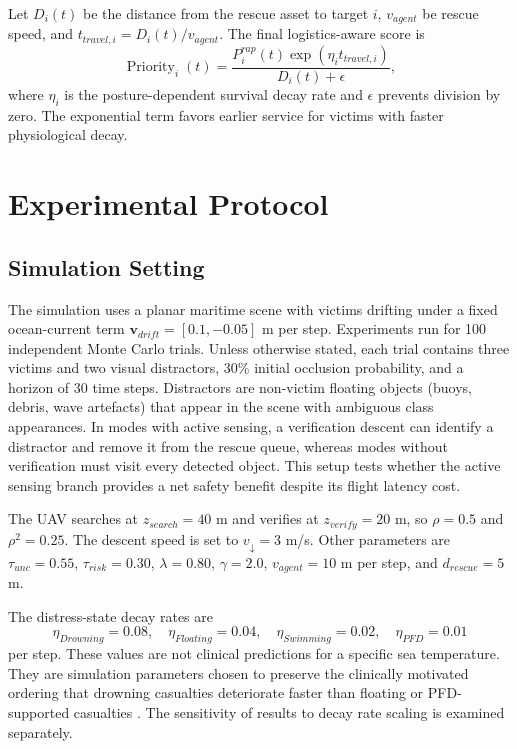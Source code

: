 \documentclass[runningheads]{llncs}
\newcommand{\operatorname}[1]{\mathop{\mathrm{#1}}}
\begin{document}
Let $D_i(t)$ be the distance from the rescue asset to target $i$, $v_{agent}$ be rescue speed, and $t_{travel,i}=D_i(t)/v_{agent}$. The final logistics-aware score is
\begin{equation}
  \operatorname{Priority}_i(t)=
  \frac{P^{rap}_i(t)\exp(\eta_i t_{travel,i})}{D_i(t)+\epsilon},
  \label{eq:priority}
\end{equation}
where $\eta_i$ is the posture-dependent survival decay rate and $\epsilon$ prevents division by zero. The exponential term favors earlier service for victims with faster physiological decay.

\section{Experimental Protocol}

\subsection{Simulation Setting}

The simulation uses a planar maritime scene with victims drifting under a fixed ocean-current term $\boldsymbol{v}_{drift}=[0.1,-0.05]$ m per step. Experiments run for 100 independent Monte Carlo trials. Unless otherwise stated, each trial contains three victims and two visual distractors, 30\% initial occlusion probability, and a horizon of 30 time steps. Distractors are non-victim floating objects (buoys, debris, wave artefacts) that appear in the scene with ambiguous class appearances. In modes with active sensing, a verification descent can identify a distractor and remove it from the rescue queue, whereas modes without verification must visit every detected object. This setup tests whether the active sensing branch provides a net safety benefit despite its flight latency cost.

The UAV searches at $z_{search}=40$ m and verifies at $z_{verify}=20$ m, so $\rho=0.5$ and $\rho^2=0.25$. The descent speed is set to $v_{\downarrow}=3$ m/s. Other parameters are $\tau_{unc}=0.55$, $\tau_{risk}=0.30$, $\lambda=0.80$, $\gamma=2.0$, $v_{agent}=10$ m per step, and $d_{rescue}=5$ m.

The distress-state decay rates are
\begin{equation}
  \eta_{Drowning}=0.08,\quad \eta_{Floating}=0.04,\quad
  \eta_{Swimming}=0.02,\quad \eta_{PFD}=0.01
\end{equation}
per step. These values are not clinical predictions for a specific sea temperature. They are simulation parameters chosen to preserve the clinically motivated ordering that drowning casualties deteriorate faster than floating or PFD-supported casualties \cite{golden2002,tipton2011,bierens2016}. The sensitivity of results to decay rate scaling is examined separately.
\end{document}
